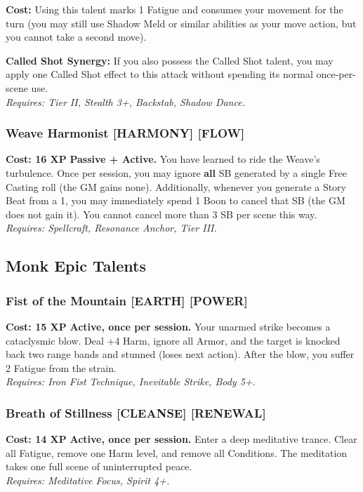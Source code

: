 \documentclass[12pt,a4paper]{book}
\begin{document}
\textbf{Cost:} Using this talent marks 1 Fatigue and consumes your movement for the turn (you may still use Shadow Meld or similar abilities as your move action, but you cannot take a second move).

\textbf{Called Shot Synergy:} If you also possess the Called Shot talent, you may apply one Called Shot effect to this attack without spending its normal once-per-scene use. \\
\textit{Requires: Tier II, Stealth 3+, Backstab, Shadow Dance.}

\subsubsection*{Weave Harmonist \textnormal{[HARMONY] [FLOW]}}
\label{talent:weave-harmonist}
\textbf{Cost: 16 XP} \textbf{Passive + Active.} You have learned to ride the Weave's turbulence. Once per session, you may ignore \textbf{all} SB generated by a single Free Casting roll (the GM gains none). Additionally, whenever you generate a Story Beat from a 1, you may immediately spend 1 Boon to cancel that SB (the GM does not gain it). You cannot cancel more than 3 SB per scene this way. \\
\textit{Requires: Spellcraft, Resonance Anchor, Tier III.}

\subsection*{Monk Epic Talents}
\label{sec:epic-monk}

\subsubsection*{Fist of the Mountain \textnormal{[EARTH] [POWER]}}
\label{talent:fist-of-the-mountain}
\textbf{Cost: 15 XP} \textbf{Active, once per session.} Your unarmed strike becomes a cataclysmic blow. Deal +4 Harm, ignore all Armor, and the target is knocked back two range bands and stunned (loses next action). After the blow, you suffer 2 Fatigue from the strain. \\
\textit{Requires: Iron Fist Technique, Inevitable Strike, Body 5+.}

\subsubsection*{Breath of Stillness \textnormal{[CLEANSE] [RENEWAL]}}
\label{talent:breath-of-stillness}
\textbf{Cost: 14 XP} \textbf{Active, once per session.} Enter a deep meditative trance. Clear all Fatigue, remove one Harm level, and remove all Conditions. The meditation takes one full scene of uninterrupted peace. \\
\textit{Requires: Meditative Focus, Spirit 4+.}
\end{document}
